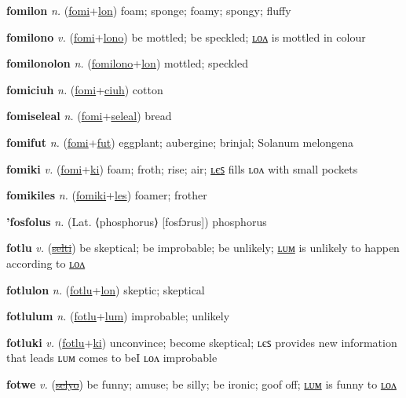\textbf{\hypertarget{fomilon}{fomilon}} \textit{n.} (\hyperlink{fomi}{fomi}+\allowbreak \hyperlink{lon}{lon})
foam; sponge; foamy; spongy; fluffy

\textbf{\hypertarget{fomilono}{fomilono}} \textit{v.} (\hyperlink{fomi}{fomi}+\allowbreak \hyperlink{lono}{lono})
be mottled; be speckled; \hyperlink{fomilonolon}{ʟᴏᴧ} is mottled in colour

\textbf{\hypertarget{fomilonolon}{fomilonolon}} \textit{n.} (\hyperlink{fomilono}{fomilono}+\allowbreak \hyperlink{lon}{lon})
mottled; speckled

\textbf{\hypertarget{fomiciuh}{fomiciuh}} \textit{n.} (\hyperlink{fomi}{fomi}+\allowbreak \hyperlink{ciuh}{ciuh})
cotton

\textbf{\hypertarget{fomiseleal}{fomiseleal}} \textit{n.} (\hyperlink{fomi}{fomi}+\allowbreak \hyperlink{seleal}{seleal})
bread

\textbf{\hypertarget{fomifut}{fomifut}} \textit{n.} (\hyperlink{fomi}{fomi}+\allowbreak \hyperlink{fut}{fut})
eggplant; aubergine; brinjal; Solanum melongena

\textbf{\hypertarget{fomiki}{fomiki}} \textit{v.} (\hyperlink{fomi}{fomi}+\allowbreak \hyperlink{ki}{ki})
foam; froth; rise; air; \hyperlink{fomikiles}{ʟєꜱ} fills ʟᴏᴧ with small pockets

\textbf{\hypertarget{fomikiles}{fomikiles}} \textit{n.} (\hyperlink{fomiki}{fomiki}+\allowbreak \hyperlink{les}{les})
foamer; frother

\textbf{\hypertarget{'fosfolus}{'fosfolus}} \textit{n.} (Lat. ⟨phosphorus⟩ [fosfɔrus])
phosphorus

\textbf{\hypertarget{fotlu}{fotlu}} \textit{v.} (\hyperlink{selti}{\sout{selti}})
be skeptical; be improbable; be unlikely; \hyperlink{fotlulum}{ʟᴜᴍ} is unlikely to happen according to \hyperlink{fotlulon}{ʟᴏᴧ}

\textbf{\hypertarget{fotlulon}{fotlulon}} \textit{n.} (\hyperlink{fotlu}{fotlu}+\allowbreak \hyperlink{lon}{lon})
skeptic; skeptical

\textbf{\hypertarget{fotlulum}{fotlulum}} \textit{n.} (\hyperlink{fotlu}{fotlu}+\allowbreak \hyperlink{lum}{lum})
improbable; unlikely

\textbf{\hypertarget{fotluki}{fotluki}} \textit{v.} (\hyperlink{fotlu}{fotlu}+\allowbreak \hyperlink{ki}{ki})
unconvince; become skeptical; ʟєꜱ provides new information that leads ʟᴜᴍ comes to beI ʟᴏᴧ improbable

\textbf{\hypertarget{fotwe}{fotwe}} \textit{v.} (\hyperlink{selyo}{\sout{selyo}})
be funny; amuse; be silly; be ironic; goof off; \hyperlink{fotwelum}{ʟᴜᴍ} is funny to \hyperlink{fotwelon}{ʟᴏᴧ}


